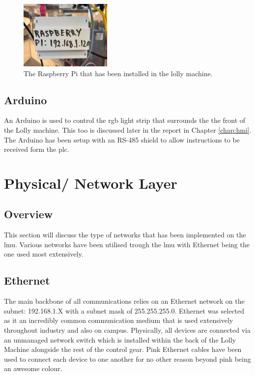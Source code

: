         \begin{figure}[H]
            \centering
            \includegraphics[width = 0.4\textwidth]{2_images/raspPiInstall}
            \caption{The Raspberry Pi that has been installed in the lolly machine.}
            \label{fig:raspPiInstall}
        \end{figure}
    
    
    \subsection{Arduino}
    An Arduino is used to control the \acrshort{rgb} light strip that surrounds the the front of the Lolly machine. This too is discussed later in the report in Chapter \ref{chap:hmi}. The Arduino has been setup with an RS-485 shield to allow instructions to be received form the \acrshort{plc}.
    
    \section{Physical/ Network Layer}
    
    \subsection{Overview}
    This section will discuss the type of networks that has been implemented on the \acrshort{lmu}. Various networks have been utilised trough the \acrshort{lmu} with Ethernet being the one used most extensively.
    
    \subsection{Ethernet} 
    The main backbone of all communications relies on an Ethernet network on the subnet: 192.168.1.X with a subnet mask of 255.255.255.0. Ethernet was selected as it an incredibly common communication medium that is used extensively throughout industry and also on campus. Physically, all devices are connected via an unmanaged network switch which is installed within the back of the Lolly Machine alongside the rest of the control gear. Pink Ethernet cables have been used to connect each device to one another for no other reason beyond pink being an awesome colour.
    
